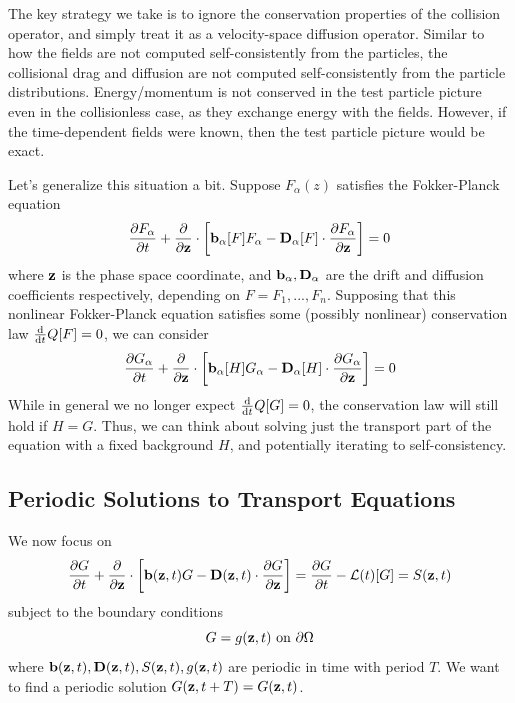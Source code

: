 \documentclass[]{article}
\begin{document}
The key strategy we take is to ignore the conservation properties of the collision operator, and simply treat it as a velocity-space diffusion operator.
Similar to how the fields are not computed self-consistently from the particles, the collisional drag and diffusion are not computed self-consistently from the particle distributions.
Energy/momentum is not conserved in the test particle picture even in the collisionless case, as they exchange energy with the fields.
However, if the time-dependent fields were known, then the test particle picture would be exact.

Let's generalize this situation a bit.
Suppose \(F_\alpha(z)\) satisfies the Fokker-Planck equation
\begin{equation*}
	\pdv{F_\alpha}{t} + \pdv{\vb{z}} \cdot \left[\vb{b}_\alpha[F] F_\alpha - \vb{D}_\alpha[F] \cdot \pdv{F_\alpha}{\vb{z}}\right] = 0
\end{equation*}
where \(\vb{z}\) is the phase space coordinate, and \(\vb{b}_\alpha, \vb{D}_\alpha\) are the drift and diffusion coefficients respectively, depending on \(F = F_1, ..., F_n\).
Supposing that this nonlinear Fokker-Planck equation satisfies some (possibly nonlinear) conservation law \(\dv{t}Q[F] = 0\), we can consider
\begin{equation*}
	\pdv{G_\alpha}{t} + \pdv{\vb{z}} \cdot \left[\vb{b}_\alpha[H] G_\alpha - \vb{D}_\alpha[H] \cdot \pdv{G_\alpha}{\vb{z}}\right] = 0
\end{equation*}
While in general we no longer expect \(\dv{t} Q[G] = 0\), the conservation law will still hold if \(H=G\).
Thus, we can think about solving just the transport part of the equation with a fixed background \(H\), and potentially iterating to self-consistency.

\subsection{Periodic Solutions to Transport Equations}
We now focus on
\begin{equation}
	\pdv{G}{t} + \pdv{\vb{z}} \cdot \left[\vb{b}(\vb{z}, t) G - \vb{D}(\vb{z}, t) \cdot \pdv{G}{\vb{z}}\right] = \pdv{G}{t} - \mathcal{L}(t)[G] = S(\vb{z}, t)
\end{equation}
subject to the boundary conditions
\begin{equation*}
	G = g(\vb{z}, t) \text{ on } \partial \Omega
\end{equation*}
where \(\vb{b}(\vb{z}, t), \vb{D}(\vb{z}, t), S(\vb{z}, t), g(\vb{z}, t)\) are periodic in time with period \(T\).
We want to find a periodic solution \(G(\vb{z}, t+T) = G(\vb{z}, t)\).
\end{document}
